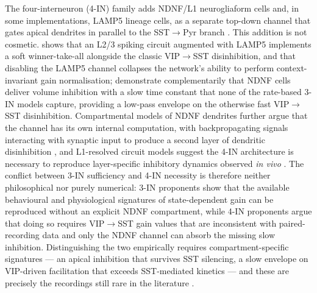 \documentclass[11pt]{article}
\let\origrightarrow\rightarrow
\def\rightarrow{\ensuremath{\origrightarrow}}
\begin{document}
The four-interneuron (4-IN) family adds NDNF/L1 neurogliaform cells \citep{Iqbal2025, Hartung2024, Vighagen2021} and, in some implementations, LAMP5 lineage cells, as a separate top-down channel that gates apical dendrites in parallel to the SST\rightarrow Pyr branch \citep{Anastasiades2021a, Bilash2023, Vanderveer2021}. This addition is not cosmetic. \citep{Iqbal2025} shows that an L2/3 spiking circuit augmented with LAMP5 implements a soft winner-take-all alongside the classic VIP\rightarrow SST disinhibition, and that disabling the LAMP5 channel collapses the network's ability to perform context-invariant gain normalisation; \citet{Hartung2024} demonstrate complementarily that NDNF cells deliver volume inhibition with a slow time constant that none of the rate-based 3-IN models capture, providing a low-pass envelope on the otherwise fast VIP\rightarrow SST disinhibition. Compartmental models of NDNF dendrites further argue that the channel has its own internal computation, with backpropagating signals interacting with synaptic input to produce a second layer of dendritic disinhibition \citep{Griesius2025}, and L1-resolved circuit models suggest the 4-IN architecture is necessary to reproduce layer-specific inhibitory dynamics observed \textit{in vivo} \citep{Vighagen2021}. The conflict between 3-IN sufficiency and 4-IN necessity is therefore neither philosophical nor purely numerical: 3-IN proponents \citep{Hertag2019, Litwinkumar2016, Bos2025} show that the available behavioural and physiological signatures of state-dependent gain can be reproduced without an explicit NDNF compartment, while 4-IN proponents \citep{Hartung2024, Vighagen2021} argue that doing so requires VIP\rightarrow SST gain values that are inconsistent with paired-recording data and only the NDNF channel can absorb the missing slow inhibition. Distinguishing the two empirically requires compartment-specific signatures --- an apical inhibition that survives SST silencing, a slow envelope on VIP-driven facilitation that exceeds SST-mediated kinetics --- and these are precisely the recordings still rare in the literature \citep{Bilash2023, Lenkey2025, Anastasiades2021a}.
\end{document}
